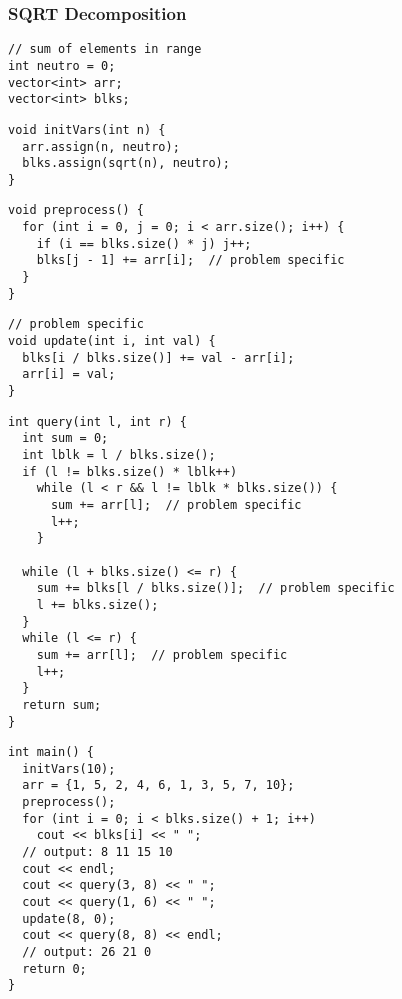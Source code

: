 \documentclass[twoside]{article}
\begin{document}
\begin{multicols*}{2}
\subsubsectionfont{\large\bfseries\sffamily\underline}
\subsubsection*{SQRT Decomposition}
\begin{verbatim}
// sum of elements in range
int neutro = 0;
vector<int> arr;
vector<int> blks;
\end{verbatim}
\vspace{-12pt}
\begin{verbatim}
void initVars(int n) {
  arr.assign(n, neutro);
  blks.assign(sqrt(n), neutro);
}
\end{verbatim}
\vspace{-12pt}
\begin{verbatim}
void preprocess() {
  for (int i = 0, j = 0; i < arr.size(); i++) {
    if (i == blks.size() * j) j++;
    blks[j - 1] += arr[i];  // problem specific
  }
}
\end{verbatim}
\vspace{-12pt}
\begin{verbatim}
// problem specific
void update(int i, int val) {
  blks[i / blks.size()] += val - arr[i];
  arr[i] = val;
}
\end{verbatim}
\vspace{-12pt}
\begin{verbatim}
int query(int l, int r) {
  int sum = 0;
  int lblk = l / blks.size();
  if (l != blks.size() * lblk++)
    while (l < r && l != lblk * blks.size()) {
      sum += arr[l];  // problem specific
      l++;
    }

  while (l + blks.size() <= r) {
    sum += blks[l / blks.size()];  // problem specific
    l += blks.size();
  }
  while (l <= r) {
    sum += arr[l];  // problem specific
    l++;
  }
  return sum;
}
\end{verbatim}
\vspace{-12pt}
\begin{verbatim}
int main() {
  initVars(10);
  arr = {1, 5, 2, 4, 6, 1, 3, 5, 7, 10};
  preprocess();
  for (int i = 0; i < blks.size() + 1; i++)
    cout << blks[i] << " ";
  // output: 8 11 15 10
  cout << endl;
  cout << query(3, 8) << " ";
  cout << query(1, 6) << " ";
  update(8, 0);
  cout << query(8, 8) << endl;
  // output: 26 21 0
  return 0;
}
\end{verbatim}


\end{multicols*}
\end{document}
